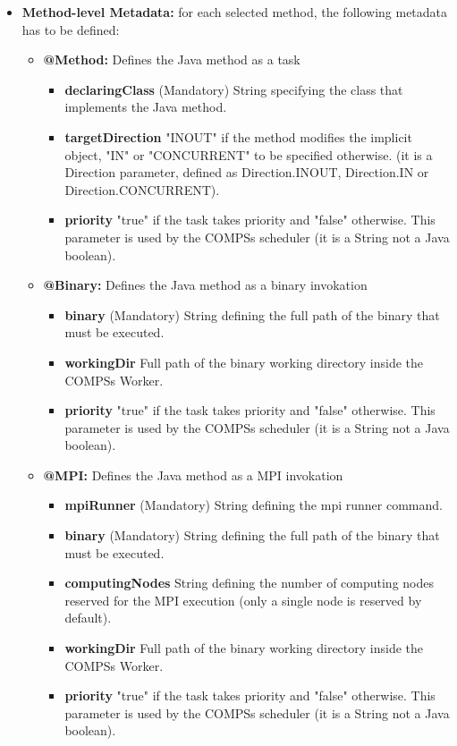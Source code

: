 \begin{itemize}
 \item \textbf{Method-level Metadata:} for each selected method, the following metadata has to be defined:
       \begin{itemize}
         \item \textbf{@Method:} Defines the Java method as a task 
		\begin{itemize}
		        \item \textbf{declaringClass} (Mandatory) String specifying the class that implements the Java method.
			\item \textbf{targetDirection} "INOUT" if the method modifies the implicit object, "IN" or "CONCURRENT" to be specified otherwise.
			(it is a Direction parameter, defined as Direction.INOUT, Direction.IN or Direction.CONCURRENT).
			\item \textbf{priority} "true" if the task takes priority and "false" otherwise. This parameter is used
			by the COMPSs scheduler (it is a String not a Java boolean).
		\end{itemize}
		
	 \item \textbf{@Binary:} Defines the Java method as a binary invokation
	        \begin{itemize}
		        \item \textbf{binary} (Mandatory) String defining the full path of the binary that must be executed.
			\item \textbf{workingDir} Full path of the binary working directory inside the COMPSs Worker.
			\item \textbf{priority} "true" if the task takes priority and "false" otherwise. This parameter is used
			by the COMPSs scheduler (it is a String not a Java boolean).
		\end{itemize}
		
	\item \textbf{@MPI:} Defines the Java method as a MPI invokation
	        \begin{itemize}
	        	\item \textbf{mpiRunner} (Mandatory) String defining the mpi runner command. 
		        \item \textbf{binary} (Mandatory) String defining the full path of the binary that must be executed.
		        \item \textbf{computingNodes} String defining the number of computing nodes reserved for the MPI execution
		        (only a single node is reserved by default).
			\item \textbf{workingDir} Full path of the binary working directory inside the COMPSs Worker.
			\item \textbf{priority} "true" if the task takes priority and "false" otherwise. This parameter is used
			by the COMPSs scheduler (it is a String not a Java boolean).
		\end{itemize}
		

\end{itemize}
\end{itemize}
